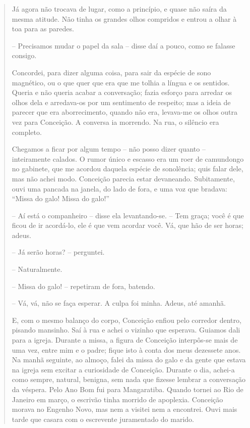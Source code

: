\begin{quote}
Já agora não trocava de lugar, como a princípio, e quase não saíra da
mesma atitude. Não tinha os grandes olhos compridos e entrou a olhar à
toa para as paredes.

-- Precisamos mudar o papel da sala -- disse daí a pouco, como se
falasse consigo.

Concordei, para dizer alguma coisa, para sair da espécie de sono
magnético, ou o que quer que era que me tolhia a língua e os sentidos.
Queria e não queria acabar a conversação; fazia esforço para arredar os
olhos dela e arredava-os por um sentimento de respeito; mas a ideia de
parecer que era aborrecimento, quando não era, levava-me os olhos outra
vez para Conceição. A conversa ia morrendo. Na rua, o silêncio era
completo.

Chegamos a ficar por algum tempo -- não posso dizer quanto --
inteiramente calados. O rumor único e escasso era um roer de camundongo
no gabinete, que me acordou daquela espécie de sonolência; quis falar
dele, mas não achei modo. Conceição parecia estar devaneando.
Subitamente, ouvi uma pancada na janela, do lado de fora, e uma voz que
bradava: ``Missa do galo! Missa do galo!''

-- Aí está o companheiro -- disse ela levantando-se. -- Tem graça; você
é que ficou de ir acordá-lo, ele é que vem acordar você. Vá, que hão de
ser horas; adeus.

-- Já serão horas? -- perguntei.

-- Naturalmente.

-- Missa do galo! -- repetiram de fora, batendo.

-- Vá, vá, não se faça esperar. A culpa foi minha. Adeus, até amanhã.

E, com o mesmo balanço do corpo, Conceição enfiou pelo corredor dentro,
pisando mansinho. Saí à rua e achei o vizinho que esperava. Guiamos dali
para a igreja. Durante a missa, a figura de Conceição interpôs-se mais
de uma vez, entre mim e o padre; fique isto à conta dos meus dezessete
anos. Na manhã seguinte, ao almoço, falei da missa do galo e da gente
que estava na igreja sem excitar a curiosidade de Conceição. Durante o
dia, achei-a como sempre, natural, benigna, sem nada que fizesse lembrar
a conversação da véspera. Pelo Ano Bom fui para Mangaratiba. Quando
tornei ao Rio de Janeiro em março, o escrivão tinha morrido de
apoplexia. Conceição morava no Engenho Novo, mas nem a visitei nem a
encontrei. Ouvi mais tarde que casara com o escrevente juramentado do
marido.
\end{quote}

